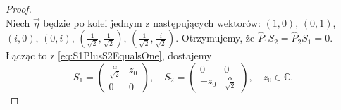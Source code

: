 \begin{proof}
\begin{equation}
\end{equation}
Niech  $\vec{\eta}$ będzie po kolei jednym z następujących wektorów:
$(1,0)$, $(0,1)$,
$(i,0)$, $(0,i)$,
$(\frac{1}{\sqrt{2}},\frac{1}{\sqrt{2}})$,
$(\frac{1}{\sqrt{2}},\frac{i}{\sqrt{2}})$.
Otrzymujemy, że $\hat{P}_{1} S_{2} = \hat{P}_{2} S_{1} = 0$.
Łącząc to z \eqref{eq:S1PlusS2EqualsOne},
dostajemy
\begin{equation}
S_{1} = \begin{pmatrix}
    \frac{\alpha}{\sqrt{2}} & z_{0} \\ 0 & 0
\end{pmatrix}, \quad
S_{2} = \begin{pmatrix}
     0 & 0 \\ - z_{0} & \frac{\alpha}{\sqrt{2}}
\end{pmatrix}, \quad
z_{0} \in \mathbb{C}.
\end{equation}


\end{proof}
